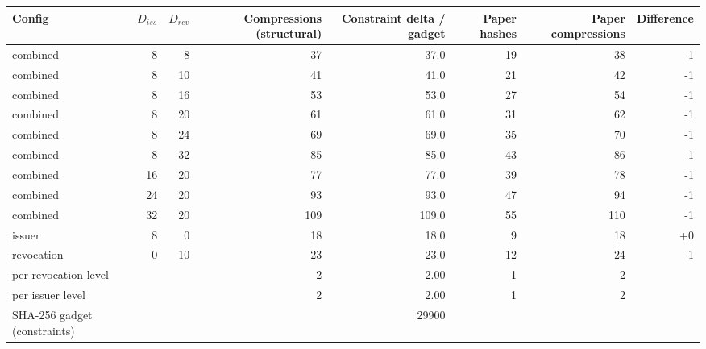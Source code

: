 \begin{tabular}{lrrrrrrr}
\toprule
Config & $D_{iss}$ & $D_{rev}$ & Compressions (structural) & Constraint delta / gadget & Paper hashes & Paper compressions & Difference \\
\midrule
combined & 8 & 8 & 37 & 37.0 & 19 & 38 & -1 \\
combined & 8 & 10 & 41 & 41.0 & 21 & 42 & -1 \\
combined & 8 & 16 & 53 & 53.0 & 27 & 54 & -1 \\
combined & 8 & 20 & 61 & 61.0 & 31 & 62 & -1 \\
combined & 8 & 24 & 69 & 69.0 & 35 & 70 & -1 \\
combined & 8 & 32 & 85 & 85.0 & 43 & 86 & -1 \\
combined & 16 & 20 & 77 & 77.0 & 39 & 78 & -1 \\
combined & 24 & 20 & 93 & 93.0 & 47 & 94 & -1 \\
combined & 32 & 20 & 109 & 109.0 & 55 & 110 & -1 \\
issuer & 8 & 0 & 18 & 18.0 & 9 & 18 & +0 \\
revocation & 0 & 10 & 23 & 23.0 & 12 & 24 & -1 \\
per revocation level &  &  & 2 & 2.00 & 1 & 2 &  \\
per issuer level &  &  & 2 & 2.00 & 1 & 2 &  \\
SHA-256 gadget (constraints) &  &  &  & 29900 &  &  &  \\
\bottomrule
\end{tabular}
